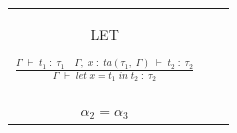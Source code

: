 {\begin{tabular}{|c|c|c|}
	& \\[5ex]
	\hline
	LET\begin{LARGE}$\frac{\Gamma\; \vdash\; t_1\;:\;\tau_1 \quad \Gamma,\; x\;:\; ta(\tau_1,\;\Gamma)\;\vdash\; t_2\; :\; \tau_2}{\Gamma\; \vdash\; let\; x = t_1\; in\; t_2\; :\; \tau_2}$\end{LARGE}
	& \multlineTable{LET\begin{LARGE}$\frac{\Gamma\; \vdash\; t_1\;:\;\alpha_2 \quad \Gamma,\; x\;:\; ta(\alpha_2,\;\Gamma)\;\vdash\; t_2\; :\; \alpha_3}{\Gamma\; \vdash\; let\; x = t_1\; in\; t_2\; :\; \alpha_1}:$\end{LARGE} \\ $\alpha_2 = \alpha_3$}  
	& \\[5ex]
	\hline
\end{tabular} 
}
\fi 

\noindent{}